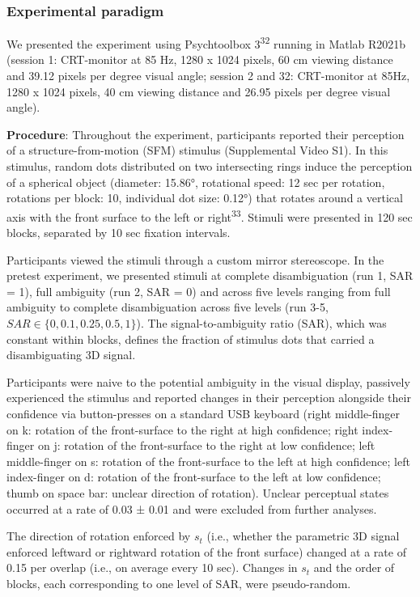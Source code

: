 \documentclass[
]{article}
\begin{document}
\subsubsection{Experimental paradigm}\label{experimental-paradigm}

We presented the experiment using Psychtoolbox 3\textsuperscript{32}
running in Matlab R2021b (session 1: CRT-monitor at 85 Hz, 1280 x 1024
pixels, 60 cm viewing distance and 39.12 pixels per degree visual angle;
session 2 and 32: CRT-monitor at 85Hz, 1280 x 1024 pixels, 40 cm viewing
distance and 26.95 pixels per degree visual angle).

\textbf{Procedure}: Throughout the experiment, participants reported
their perception of a structure-from-motion (SFM) stimulus (Supplemental
Video S1). In this stimulus, random dots distributed on two intersecting
rings induce the perception of a spherical object (diameter: 15.86°,
rotational speed: 12 sec per rotation, rotations per block: 10,
individual dot size: 0.12°) that rotates around a vertical axis with the
front surface to the left or right\textsuperscript{33}. Stimuli were
presented in 120 sec blocks, separated by 10 sec fixation intervals.

Participants viewed the stimuli through a custom mirror stereoscope. In
the pretest experiment, we presented stimuli at complete disambiguation
(run 1, SAR = 1), full ambiguity (run 2, SAR = 0) and across five levels
ranging from full ambiguity to complete disambiguation across five
levels (run 3-5, \(SAR \in \{0, 0.1, 0.25, 0.5, 1\}\)). The
signal-to-ambiguity ratio (SAR), which was constant within blocks,
defines the fraction of stimulus dots that carried a disambiguating 3D
signal.

Participants were naive to the potential ambiguity in the visual
display, passively experienced the stimulus and reported changes in
their perception alongside their confidence via button-presses on a
standard USB keyboard (right middle-finger on k: rotation of the
front-surface to the right at high confidence; right index-finger on j:
rotation of the front-surface to the right at low confidence; left
middle-finger on s: rotation of the front-surface to the left at high
confidence; left index-finger on d: rotation of the front-surface to the
left at low confidence; thumb on space bar: unclear direction of
rotation). Unclear perceptual states occurred at a rate of 0.03 ± 0.01
and were excluded from further analyses.

The direction of rotation enforced by \(s_t\) (i.e., whether the
parametric 3D signal enforced leftward or rightward rotation of the
front surface) changed at a rate of 0.15 per overlap (i.e., on average
every 10 sec). Changes in \(s_t\) and the order of blocks, each
corresponding to one level of SAR, were pseudo-random.
\end{document}
